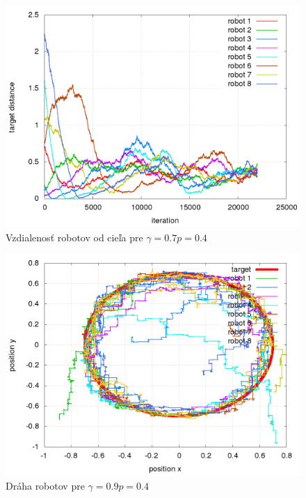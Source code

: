 \begin{figure}[!htb]
\centering
\includegraphics[scale=.4]{../../results_q_learning/nano_q_learning/result_04_02/robot_reward.png}
\caption{Vzdialenosť robotov od cieľa pre $\gamma = 0.7 p = 0.4$}
\label{img:nano_q_result_04_2_error}
\end{figure}


\begin{figure}[!htb]
\centering
\includegraphics[scale=.4]{../../results_q_learning/nano_q_learning/result_04_03/robot_path.png}
\caption{Dráha robotov pre $\gamma = 0.9 p = 0.4$}
\label{img:nano_q_result_04_3_path}
\end{figure}

